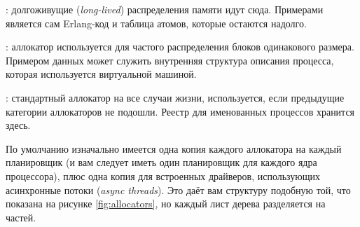 \begin{enumerate*}
	\item {}: долгоживущие (\emph{long-lived}) распределения памяти идут сюда. Примерами является сам Erlang-код и таблица атомов, которые остаются надолго.
	\item {}: аллокатор используется для частого распределения блоков одинакового размера. Примером данных может служить внутренняя структура описания процесса, которая используется виртуальной машиной.
	\item {}: стандартный аллокатор на все случаи жизни, используется, если предыдущие категории аллокаторов не подошли. Реестр для именованных процессов хранится здесь.	
\end{enumerate*}

По умолчанию изначально имеется одна копия каждого аллокатора на каждый планировщик (и вам следует иметь один планировщик для каждого ядра процессора), плюс одна копия для встроенных драйверов, использующих асинхронные потоки (\emph{async threads}). Это даёт вам структуру подобную той, что показана на рисунке \ref{fig:allocators}, но каждый лист дерева разделяется на  частей.

